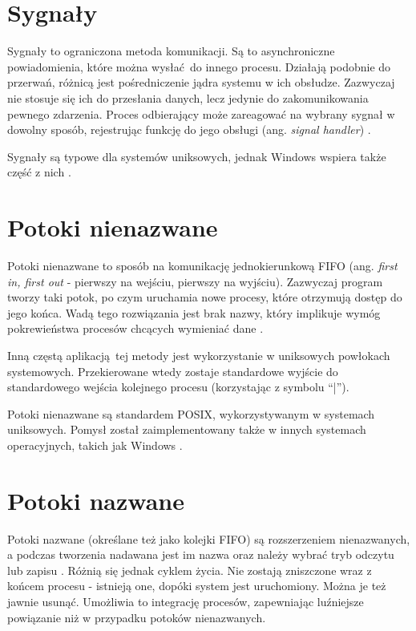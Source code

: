 \section{Sygnały}

Sygnały to ograniczona metoda komunikacji. Są to asynchroniczne powiadomienia, które można wysłać do innego procesu. Działają podobnie do przerwań, różnicą jest pośredniczenie jądra systemu w ich obsłudze. Zazwyczaj nie stosuje się ich do przesłania danych, lecz jedynie do zakomunikowania pewnego zdarzenia. Proces odbierający może zareagować na wybrany sygnał w dowolny sposób, rejestrując funkcję do jego obsługi (ang. \textit{signal handler}) \cite{SIGNALS}.

Sygnały są typowe dla systemów uniksowych, jednak Windows wspiera także część z nich \cite{WIN_COMP}.


\section{Potoki nienazwane}

Potoki nienazwane to sposób na komunikację jednokierunkową FIFO (ang. \textit{first in, first out} - pierwszy na wejściu, pierwszy na wyjściu). Zazwyczaj program tworzy taki potok, po czym uruchamia nowe procesy, które otrzymują dostęp do jego końca. 
Wadą tego rozwiązania jest brak nazwy, który implikuje wymóg pokrewieństwa procesów chcących wymieniać dane \cite{Ste92}.

Inną częstą aplikacją tej metody jest wykorzystanie w uniksowych powłokach systemowych. Przekierowane wtedy zostaje standardowe wyjście do standardowego wejścia kolejnego procesu (korzystając z symbolu \enquote{|}).

Potoki nienazwane są standardem POSIX, wykorzystywanym w systemach uniksowych. Pomysł został zaimplementowany także w innych systemach operacyjnych, takich jak Windows \cite{PIPE_WIN}.

\section{Potoki nazwane}

Potoki nazwane (określane też jako kolejki FIFO) są rozszerzeniem nienazwanych, a podczas tworzenia nadawana jest im nazwa oraz należy wybrać tryb odczytu lub zapisu \cite{Ste92}. Różnią się jednak cyklem życia. Nie zostają zniszczone wraz z końcem procesu - istnieją one, dopóki system jest uruchomiony. Można je też jawnie usunąć. Umożliwia to integrację procesów, zapewniając luźniejsze powiązanie niż w przypadku potoków nienazwanych.

